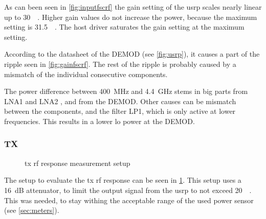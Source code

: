 \documentclass[12pt,a4paper,parskip=full,abstracton]{scrartcl}
\begin{document}
As can been seen in \cref{fig:inputfscrf} the gain setting of the \gls{usrp} scales nearly
linear up to \SI{30}{\deci\belm}. Higher gain values do not increase the power, because
the maximum setting is \SI{31.5}{\deci\belm}. The host driver saturates the gain setting
at the maximum setting.

According to the datasheet of the DEMOD \cite{demod} (see \cref{fig:usrp}), it
causes a part of the ripple seen in \cref{fig:gainfscrf}. The rest of the ripple is
probably caused by a mismatch of the individual consecutive components.

The power difference between \SI{400}{\mega\hertz} and \SI{4.4}{\giga\hertz}
stems in big parts from LNA1 and LNA2 \cite{rxlna}, and from the DEMOD. Other
causes can be mismatch between the components, and the filter LP1, which is only
active at lower frequencies. This results in a lower \gls{lo} power at the DEMOD.

\subsubsection{TX}
\label{sec:rftx}
\begin{figure}[htb]
    \centering
    \caption{\gls{tx} \gls{rf} response measurement setup}
    \label{fig:txrfsetup}
\end{figure}

The setup to evaluate the \gls{tx} \gls{rf} response can be seen in \cref{fig:txrfsetup}.
This setup uses a \SI{16}{\deci\bel} attenuator, to limit the output signal from the \gls{usrp}
to not exceed \SI{20}{\deci\belm}. This was needed, to stay withing the acceptable range
of the used power sensor (see \cref{sec:meters}).
\end{document}
